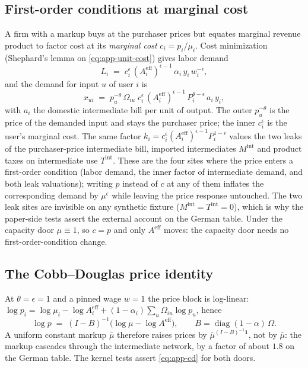\subsection{First-order conditions at marginal cost}\label{app:pricing-foc}
A firm with a markup buys at the purchaser prices but equates marginal revenue
product to factor cost at its \emph{marginal cost} $c_i = p_i/\mu_i$. Cost
minimization (Shephard's lemma on \eqref{eq:app-unit-cost}) gives labor demand
\begin{equation}\label{eq:app-labour}
  L_i \;=\; c_i^{\epsilon}\,(A^{\mathrm{eff}}_i)^{\epsilon-1}\,\alpha_i\,y_i\,w_i^{-\epsilon},
\end{equation}
and the demand for input $u$ of user $i$ is
\begin{equation}\label{eq:app-intermediate}
  x_{ui} \;=\; p_u^{-\theta}\,\Omega_{iu}\;
     c_i^{\epsilon}\,(A^{\mathrm{eff}}_i)^{\epsilon-1}\,P_i^{\theta-\epsilon}\,a_i\,y_i ,
\end{equation}
with $a_i$ the domestic intermediate bill per unit of output. The outer
$p_u^{-\theta}$ is the price of the demanded input and stays the purchaser
price; the inner $c_i^{\epsilon}$ is the user's marginal cost. The same factor
$k_i = c_i^{\epsilon}(A^{\mathrm{eff}}_i)^{\epsilon-1}P_i^{1-\epsilon}$ values
the two leaks of the purchaser-price intermediate bill, imported
intermediates $M^{\mathrm{int}}$ and product taxes on intermediate use
$T^{\mathrm{int}}$. These are the four sites where the price enters a
first-order condition (labor demand, the inner factor of intermediate demand,
and both leak valuations); writing $p$ instead of $c$ at any of them inflates
the corresponding demand by $\mu^{\epsilon}$ while leaving the price response
untouched. The two leak sites are invisible on any synthetic fixture
($M^{\mathrm{int}} = T^{\mathrm{int}} = 0$), which is why the paper-side tests
assert the external account on the German table. Under the capacity door
$\mu \equiv 1$, so $c = p$ and only $A^{\mathrm{eff}}$ moves: the capacity door
needs no first-order-condition change.

\subsection{The Cobb--Douglas price identity}\label{app:pricing-cd}
At $\theta = \epsilon = 1$ and a pinned wage $w = 1$ the price block is
log-linear: $\log p_i = \log \mu_i - \log A^{\mathrm{eff}}_i
+ (1-\alpha_i)\sum_u \Omega_{iu}\log p_u$, hence
\begin{equation}\label{eq:app-cd}
  \log p \;=\; (I - B)^{-1}\bigl(\log \mu - \log A^{\mathrm{eff}}\bigr),
  \qquad B = \operatorname{diag}(1-\alpha)\,\Omega .
\end{equation}
A uniform constant markup $\bar\mu$ therefore raises prices by
$\bar\mu^{(I-B)^{-1}\mathbf 1}$, not by $\bar\mu$: the markup cascades through
the intermediate network, by a factor of about $1.8$ on the German table. The
kernel tests assert \eqref{eq:app-cd} for both doors.


